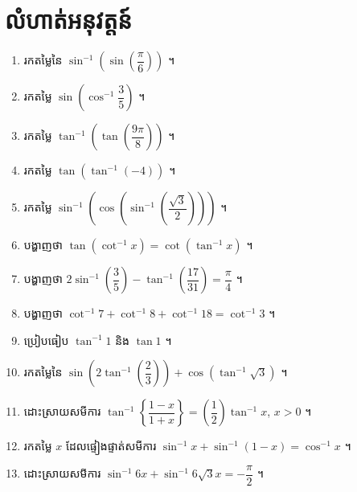 \section*{លំហាត់អនុវត្តន៍}
\begin{enumerate}[1]
  \item រកតម្លៃនៃ $\sin^{-1}\left(\sin\left(\dfrac{\pi}{6}\right)\right)$ ។
  \item រកតម្លៃ $\sin\left(\cos^{-1}\dfrac{3}{5}\right)$ ។
  \item រកតម្លៃ $\tan^{-1}\left(\tan\left(\dfrac{9\pi}{8}\right)\right)$ ។
  \item រកតម្លៃ $\tan(\tan^{-1}(-4))$ ។
  \item រកតម្លៃ $\sin^{-1}\left(\cos\left(\sin^{-1}\left(\dfrac{\sqrt{3}}{2}\right)\right)\right)$ ។
  \item បង្ហាញថា $\tan(\cot^{-1}x) = \cot(\tan^{-1}x)$ ។
  \item បង្ហាញថា $2\sin^{-1}\left(\dfrac{3}{5}\right) - \tan^{-1}\left(\dfrac{17}{31}\right) = \dfrac{\pi}{4}$ ។
  \item បង្ហាញថា $\cot^{-1}7 + \cot^{-1}8 + \cot^{-1}18 = \cot^{-1}3$ ។
  \item ប្រៀបធៀប $\tan^{-1}1$ និង $\tan 1$ ។
  \item រកតម្លៃនៃ $\sin\left(2\tan^{-1}\left(\dfrac{2}{3}\right)\right) + \cos(\tan^{-1}\sqrt{3})$ ។
  \item ដោះស្រាយសមីការ $\tan^{-1}\left\{\dfrac{1 - x}{1 + x}\right\} = \left(\dfrac{1}{2}\right)\tan^{-1}x$, $x > 0$ ។
  \item រកតម្លៃ $x$ ដែលផ្ទៀងផ្ទាត់សមីការ $\sin^{-1}x + \sin^{-1}(1 - x) = \cos^{-1}x$ ។
  \item ដោះស្រាយសមីការ $\sin^{-1}6x + \sin^{-1}6\sqrt{3}x = -\dfrac{\pi}{2}$ ។
\end{enumerate}
